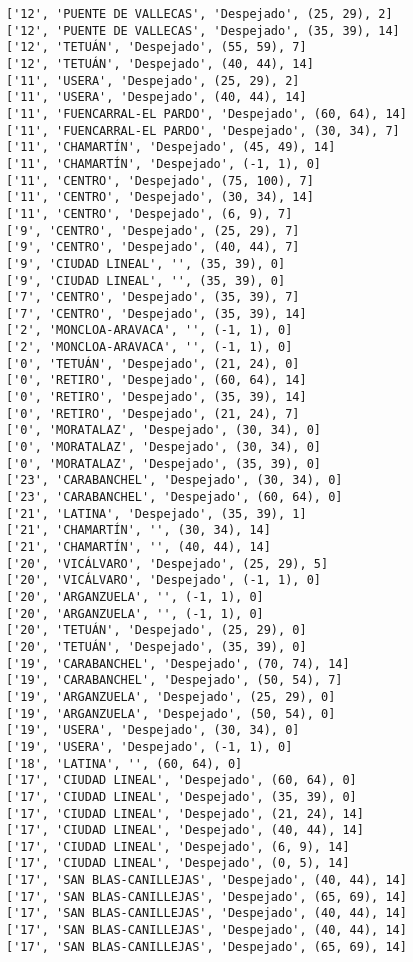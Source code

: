 \documentclass[11pt]{article}
\begin{document}
\begin{Verbatim}[commandchars=\\\{\}]
['12', 'PUENTE DE VALLECAS', 'Despejado', (25, 29), 2]
['12', 'PUENTE DE VALLECAS', 'Despejado', (35, 39), 14]
['12', 'TETUÁN', 'Despejado', (55, 59), 7]
['12', 'TETUÁN', 'Despejado', (40, 44), 14]
['11', 'USERA', 'Despejado', (25, 29), 2]
['11', 'USERA', 'Despejado', (40, 44), 14]
['11', 'FUENCARRAL-EL PARDO', 'Despejado', (60, 64), 14]
['11', 'FUENCARRAL-EL PARDO', 'Despejado', (30, 34), 7]
['11', 'CHAMARTÍN', 'Despejado', (45, 49), 14]
['11', 'CHAMARTÍN', 'Despejado', (-1, 1), 0]
['11', 'CENTRO', 'Despejado', (75, 100), 7]
['11', 'CENTRO', 'Despejado', (30, 34), 14]
['11', 'CENTRO', 'Despejado', (6, 9), 7]
['9', 'CENTRO', 'Despejado', (25, 29), 7]
['9', 'CENTRO', 'Despejado', (40, 44), 7]
['9', 'CIUDAD LINEAL', '', (35, 39), 0]
['9', 'CIUDAD LINEAL', '', (35, 39), 0]
['7', 'CENTRO', 'Despejado', (35, 39), 7]
['7', 'CENTRO', 'Despejado', (35, 39), 14]
['2', 'MONCLOA-ARAVACA', '', (-1, 1), 0]
['2', 'MONCLOA-ARAVACA', '', (-1, 1), 0]
['0', 'TETUÁN', 'Despejado', (21, 24), 0]
['0', 'RETIRO', 'Despejado', (60, 64), 14]
['0', 'RETIRO', 'Despejado', (35, 39), 14]
['0', 'RETIRO', 'Despejado', (21, 24), 7]
['0', 'MORATALAZ', 'Despejado', (30, 34), 0]
['0', 'MORATALAZ', 'Despejado', (30, 34), 0]
['0', 'MORATALAZ', 'Despejado', (35, 39), 0]
['23', 'CARABANCHEL', 'Despejado', (30, 34), 0]
['23', 'CARABANCHEL', 'Despejado', (60, 64), 0]
['21', 'LATINA', 'Despejado', (35, 39), 1]
['21', 'CHAMARTÍN', '', (30, 34), 14]
['21', 'CHAMARTÍN', '', (40, 44), 14]
['20', 'VICÁLVARO', 'Despejado', (25, 29), 5]
['20', 'VICÁLVARO', 'Despejado', (-1, 1), 0]
['20', 'ARGANZUELA', '', (-1, 1), 0]
['20', 'ARGANZUELA', '', (-1, 1), 0]
['20', 'TETUÁN', 'Despejado', (25, 29), 0]
['20', 'TETUÁN', 'Despejado', (35, 39), 0]
['19', 'CARABANCHEL', 'Despejado', (70, 74), 14]
['19', 'CARABANCHEL', 'Despejado', (50, 54), 7]
['19', 'ARGANZUELA', 'Despejado', (25, 29), 0]
['19', 'ARGANZUELA', 'Despejado', (50, 54), 0]
['19', 'USERA', 'Despejado', (30, 34), 0]
['19', 'USERA', 'Despejado', (-1, 1), 0]
['18', 'LATINA', '', (60, 64), 0]
['17', 'CIUDAD LINEAL', 'Despejado', (60, 64), 0]
['17', 'CIUDAD LINEAL', 'Despejado', (35, 39), 0]
['17', 'CIUDAD LINEAL', 'Despejado', (21, 24), 14]
['17', 'CIUDAD LINEAL', 'Despejado', (40, 44), 14]
['17', 'CIUDAD LINEAL', 'Despejado', (6, 9), 14]
['17', 'CIUDAD LINEAL', 'Despejado', (0, 5), 14]
['17', 'SAN BLAS-CANILLEJAS', 'Despejado', (40, 44), 14]
['17', 'SAN BLAS-CANILLEJAS', 'Despejado', (65, 69), 14]
['17', 'SAN BLAS-CANILLEJAS', 'Despejado', (40, 44), 14]
['17', 'SAN BLAS-CANILLEJAS', 'Despejado', (40, 44), 14]
['17', 'SAN BLAS-CANILLEJAS', 'Despejado', (65, 69), 14]

\end{Verbatim}
\end{document}
